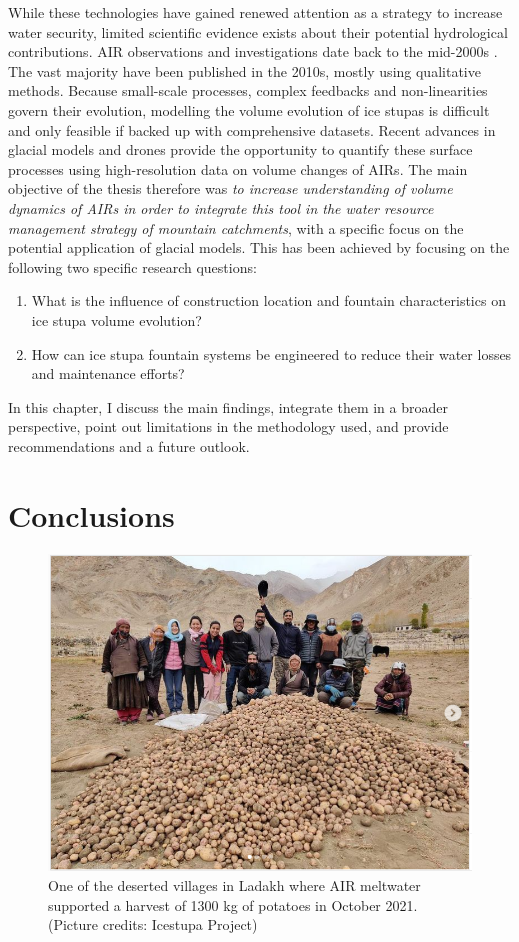 While these technologies have gained renewed attention as a strategy to increase water security, limited
scientific evidence exists about their potential hydrological contributions. AIR observations and investigations
date back to the mid-2000s \citep{tveitenGlacierGrowingLocal2007}. The vast majority have been published in the
2010s, mostly using qualitative methods. Because small-scale processes, complex feedbacks and non-linearities
govern their evolution, modelling the volume evolution of ice stupas is difficult and only feasible if backed up
with comprehensive datasets. Recent advances in glacial models and drones provide the opportunity to quantify
these surface processes using high-resolution data on volume changes of \ac{AIRs}. The main objective of the
thesis therefore was \textit{to increase understanding of volume dynamics of \ac{AIRs} in order to integrate
this tool in the water resource management strategy of mountain catchments}, with a specific focus on the
potential application of glacial models. This has been achieved by focusing on the following two specific
research questions:

\begin{enumerate}
  \item{What is the influence of construction location and fountain characteristics on ice stupa volume
    evolution?}
  \item{How can ice stupa fountain systems be engineered to reduce their water losses and maintenance efforts?}
\end{enumerate}

In this chapter, I discuss the main findings, integrate them in a broader perspective, point out limitations in
the methodology used, and provide recommendations and a future outlook.

\section{Conclusions}

\begin{figure}[htb]
  \centering
	\includegraphics[width=8 cm]{figs/Kullum_potatoes}
	\caption{One of the deserted villages in Ladakh where AIR meltwater supported a harvest of 1300 kg of
		potatoes in October 2021. (Picture credits: Icestupa Project)}
	\label{fig:kullum_potatoes}
\end{figure}

